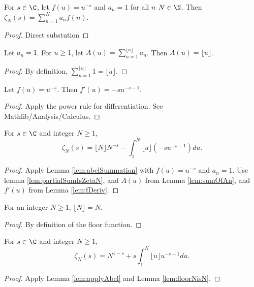 \begin{lemma}\label{lem:partialSumIsZetaN}
\leanok
{}
For $s\in\C$, let $f(u) = u^{-s}$ and $a_n=1$ for all $n$ $N\in\N$. Then $\zeta_N(s) = \sum_{n=1}^N a_n f(n)$.
\end{lemma}
\begin{proof}
\leanok
Direct substution
\end{proof}

\begin{lemma}\label{lem:sumOfAn}
\leanok
Let $a_n=1$. For $u\ge 1$, let $A(u) = \sum_{n=1}^{\lfloor u \rfloor} a_n$. Then $A(u) = \lfloor u \rfloor$.
\end{lemma}
\begin{proof}
\leanok
By definition, $\sum_{n=1}^{\lfloor u \rfloor} 1 = \lfloor u \rfloor$.
\end{proof}

\begin{lemma}\label{lem:fDeriv}
\leanok
Let $f(u) = u^{-s}$. Then $f'(u) = -s u^{-s-1}$.
\end{lemma}
\begin{proof}
\leanok
Apply the power rule for differentiation. See Mathlib/Analysis/Calculus.
\end{proof}

\begin{lemma}\label{lem:applyAbel}
\leanok
{}
For $s\in\C$ and integer $N\ge 1$,
\[ \zeta_N(s) = \lfloor N \rfloor N^{-s} - \int_1^N \lfloor u \rfloor (-s u^{-s-1}) du. \]
\end{lemma}
\begin{proof}
\leanok
Apply Lemma \ref{lem:abelSummation} with $f(u)=u^{-s}$ and $a_n=1$. Use lemma \ref{lem:partialSumIsZetaN}, and $A(u)$ from Lemma \ref{lem:sumOfAn}, and $f'(u)$ from Lemma \ref{lem:fDeriv}.
\end{proof}

\begin{lemma}\label{lem:floorNisN}
\leanok
For an integer $N\ge 1$, $\lfloor N \rfloor = N$.
\end{lemma}
\begin{proof}
\leanok
By definition of the floor function.
\end{proof}

\begin{lemma}\label{lem:zetaNsimplified1}
 \leanok
{}
For $s\in\C$ and integer $N\ge 1$,
\[ \zeta_N(s) = N^{1-s} + s \int_1^N \lfloor u \rfloor u^{-s-1} du. \]
\end{lemma}
\begin{proof}
\leanok
{}
Apply Lemma \ref{lem:applyAbel} and Lemma \ref{lem:floorNisN}.
\end{proof}


